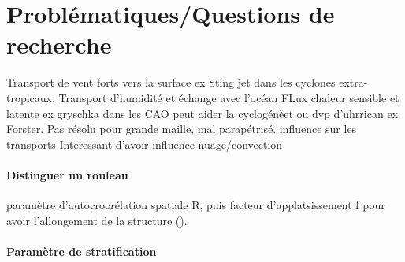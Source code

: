 \section{Problématiques/Questions de recherche}
Transport de vent forts vers la surface ex Sting jet dans les cyclones extra-tropicaux. 
Transport d'humidité et échange avec l'océan FLux chaleur sensible et latente ex gryschka dans les CAO peut aider la cyclogénèet ou dvp d'uhrrican ex Forster. 
Pas résolu pour grande maille, mal parapétrisé. influence sur les transports
Interessant d'avoir influence nuage/convection



\paragraph{Distinguer un rouleau}
paramètre d'autocroorélation spatiale R, puis facteur d'applatsissement f pour avoir l'allongement de la structure (\cite{lfarhImpactSurfaceTurbulent2024}).

\paragraph{Paramètre de stratification}

